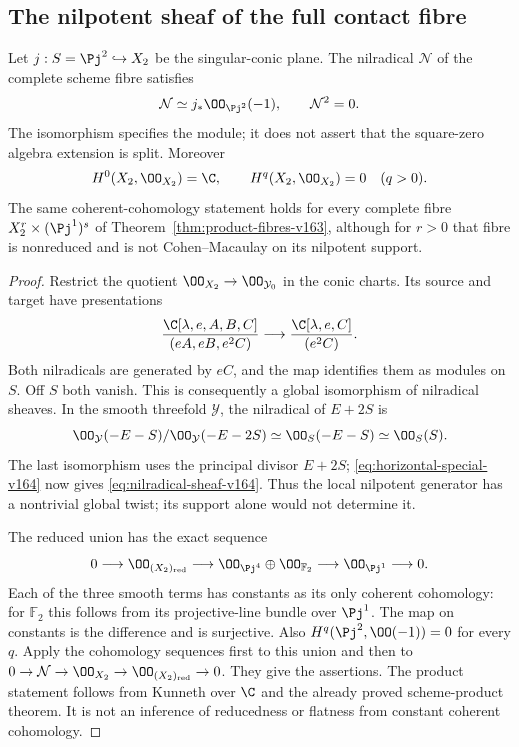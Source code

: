 \subsection{The nilpotent sheaf of the full contact fibre}
\begin{theorem}
\label{thm:nilradical-sheaf-v164}
Let $j:S=\Pj^2\hookrightarrow X_2$ be the singular-conic plane.
The nilradical $\mathcal N$ of the complete scheme fibre satisfies
\begin{equation}\label{eq:nilradical-sheaf-v164}
                \mathcal N\simeq j_*\OO_{\Pj^2}(-1),
                         \qquad\mathcal N^2=0.
\end{equation}
The isomorphism specifies the module; it does not assert that the
square-zero algebra extension is split. Moreover
\[
 H^0(X_2,\OO_{X_2})=\C,\qquad
 H^q(X_2,\OO_{X_2})=0\quad(q>0).
\]
The same coherent-cohomology statement holds for every complete
fibre $X_2^r\times(\Pj^1)^s$ of
Theorem~\ref{thm:product-fibres-v163}, although for $r>0$ that
fibre is nonreduced and is not Cohen--Macaulay on its nilpotent support.
\end{theorem}
\begin{proof}
Restrict the quotient $\OO_{X_2}\to\OO_{\mathcal Y_0}$ in the
conic charts. Its source and target have presentations
\[
 \frac{\C[\lambda,e,A,B,C]}{(eA,eB,e^2C)}
       \longrightarrow
 \frac{\C[\lambda,e,C]}{(e^2C)}.
\]
Both nilradicals are generated by $eC$, and the map identifies
them as modules on $S$. Off $S$ both vanish. This is consequently
a global isomorphism of nilradical sheaves.
In the smooth threefold $\mathcal Y$, the nilradical of $E+2S$ is
\[
 \OO_{\mathcal Y}(-E-S)/\OO_{\mathcal Y}(-E-2S)
            \simeq\OO_S(-E-S)\simeq\OO_S(S).
\]
The last isomorphism uses the principal divisor $E+2S$;
\eqref{eq:horizontal-special-v164} now gives
\eqref{eq:nilradical-sheaf-v164}. Thus the local nilpotent generator
has a nontrivial global twist; its support alone would not determine it.

The reduced union has the exact sequence
\[
 0\longrightarrow\OO_{(X_2)_{\rm red}}\longrightarrow
 \OO_{\Pj^4}\oplus\OO_{\mathbb F_2}
 \longrightarrow\OO_{\Pj^1}\longrightarrow0.
\]
Each of the three smooth terms has constants as its only coherent
cohomology: for $\mathbb F_2$ this follows from its projective-line
bundle over $\Pj^1$. The map on constants is the difference and is
surjective. Also $H^q(\Pj^2,\OO(-1))=0$ for every $q$.
Apply the cohomology sequences first to this union and then to
$0\to\mathcal N\to\OO_{X_2}\to\OO_{(X_2)_{\rm red}}\to0$.
They give the assertions. The product statement follows from
Kunneth over $\C$ and the already proved scheme-product theorem.
It is not an inference of reducedness or flatness from constant
coherent cohomology.
\end{proof}

